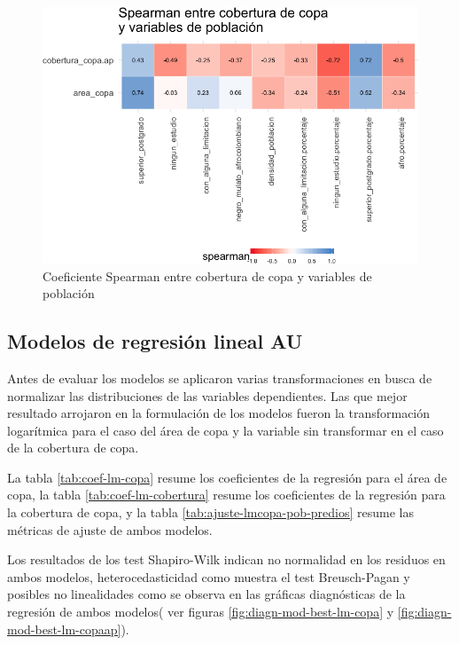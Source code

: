 \documentclass[12pt,a4paper,openany]{book}
\theoremstyle{definition}
\theoremstyle{definition}
\theoremstyle{definition}
\theoremstyle{remark}
\begin{document}
\begin{figure}[H]

{\centering \includegraphics[width=1\linewidth]{tesis-unigis_files/figure-latex/tile-copa-poblacion-spearman-1} 

}

\caption{Coeficiente Spearman entre cobertura de copa y variables de población}\label{fig:tile-copa-poblacion-spearman}
\end{figure}

\subsection{Modelos de regresión lineal
AU}\label{modelos-de-regresiuxf3n-lineal-au}

Antes de evaluar los modelos se aplicaron varias transformaciones en
busca de normalizar las distribuciones de las variables dependientes.
Las que mejor resultado arrojaron en la formulación de los modelos
fueron la transformación logarítmica para el caso del área de copa y la
variable sin transformar en el caso de la cobertura de copa.

La tabla \ref{tab:coef-lm-copa} resume los coeficientes de la regresión
para el área de copa, la tabla \ref{tab:coef-lm-cobertura} resume los
coeficientes de la regresión para la cobertura de copa, y la tabla
\ref{tab:ajuste-lmcopa-pob-predios} resume las métricas de ajuste de
ambos modelos.

Los resultados de los test Shapiro-Wilk indican no normalidad en los
residuos en ambos modelos, heterocedasticidad como muestra el test
Breusch-Pagan y posibles no linealidades como se observa en las gráficas
diagnósticas de la regresión de ambos modelos( ver figuras
\ref{fig:diagn-mod-best-lm-copa} y \ref{fig:diagn-mod-best-lm-copaap}).
\end{document}
